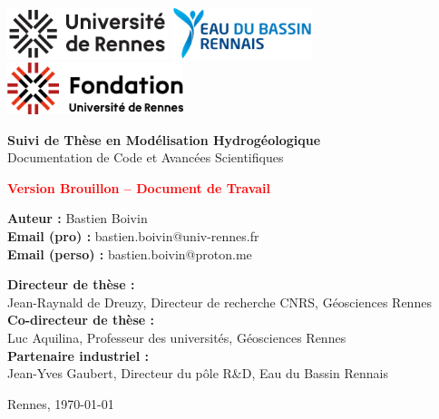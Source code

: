 \begin{titlepage}
    \thispagestyle{empty}
    \begin{center}
      \includegraphics[height=1.5cm]{figures/logos/Logo_Univ_Rennes.png}\hspace{1cm}%
      \includegraphics[height=1.5cm]{figures/logos/Logo_EBR.png}\hspace{1cm}%
      \includegraphics[height=1.5cm]{figures/logos/Logo_Fondation_Rennes.png}
      \vspace{2cm}
  
      {\Huge\textbf{Suivi de Thèse en Modélisation Hydrogéologique}}\\[0.5cm]
      {\Large Documentation de Code et Avancées Scientifiques}
      \vspace{1.5cm}
  
      {\Large\textcolor{red}{\textbf{Version Brouillon – Document de Travail}}}
      \vspace{2cm}
  
      {\large
        \textbf{Auteur :} Bastien Boivin\\[0.3cm]
        \textbf{Email (pro) :} bastien.boivin@univ-rennes.fr\\
        \textbf{Email (perso) :} bastien.boivin@proton.me\\[1cm]
      }
  
      \noindent
      \begin{flushleft}
        \textbf{Directeur de thèse :}\\
        Jean-Raynald de Dreuzy, Directeur de recherche CNRS, Géosciences Rennes\\[0.5cm]
        \textbf{Co-directeur de thèse :}\\
        Luc Aquilina, Professeur des universités, Géosciences Rennes\\[0.5cm]
        \textbf{Partenaire industriel :}\\
        Jean-Yves Gaubert, Directeur du pôle R\&D, Eau du Bassin Rennais\\
      \end{flushleft}
  
      \vfill
      Rennes, \today
    \end{center}
  \end{titlepage}
  